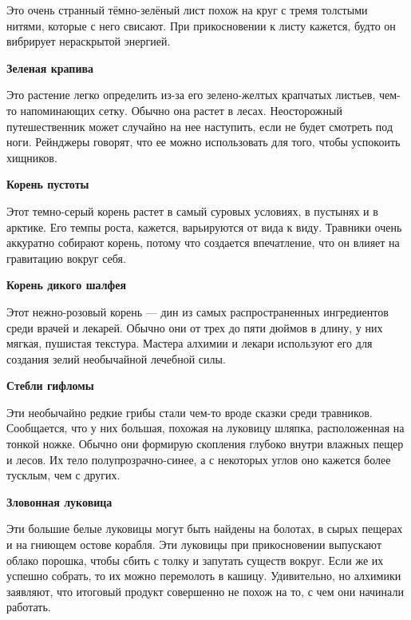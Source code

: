 \documentclass[a4paper, 9pt, twocolumn]{book}
\begin{document}
	\smallskip
	
	\noindent Это очень странный тёмно-зелёный лист похож на круг с тремя толстыми нитями, которые с него свисают. При прикосновении к листу кажется, будто он вибрирует нераскрытой энергией.
	
	\medspace
	
	\noindent \textbf{Зеленая крапива}
	
	\smallskip
	
	\noindent Это растение легко определить из-за его зелено-желтых крапчатых листьев, чем-то напоминающих сетку. Обычно она растет в лесах. Неосторожный путешественник может случайно на нее наступить, если не будет смотреть под ноги. Рейнджеры говорят, что ее можно использовать для того, чтобы успокоить хищников.
	
	\medspace
	
	\noindent \textbf{Корень пустоты}
	
	\smallskip
	
	\noindent Этот темно-серый корень растет в самый суровых условиях, в пустынях и в арктике. Его темпы роста, кажется, варьируются от вида к виду. Травники очень аккуратно собирают корень, потому что создается впечатление, что он влияет на гравитацию вокруг себя.
	
	\medspace
	
	\noindent \textbf{Корень дикого шалфея}
	
	\smallskip
	
	\noindent Этот нежно-розовый корень --- дин из самых распространенных ингредиентов среди врачей и лекарей. Обычно они от трех до пяти дюймов в длину, у них мягкая, пушистая текстура. Мастера алхимии и лекари используют его для создания зелий необычайной лечебной силы.
	
	\medspace
	
	\noindent \textbf{Стебли гифломы}
	
	\smallskip
	
	\noindent Эти необычайно редкие грибы стали чем-то вроде сказки среди травников. Сообщается, что у них большая, похожая на луковицу шляпка, расположенная на тонкой ножке. Обычно они формирую скопления глубоко внутри влажных пещер и лесов. Их тело полупрозрачно-синее, а с некоторых углов оно кажется более тусклым, чем с других.
	
	\medspace
	
	\noindent \textbf{Зловонная луковица}
	
	\smallskip
	
	\noindent Эти большие белые луковицы могут быть найдены на болотах, в сырых пещерах и на гниющем остове корабля. Эти луковицы при прикосновении выпускают облако порошка, чтобы сбить с толку и запутать существ вокруг. Если же их успешно собрать, то их можно перемолоть в кашицу. Удивительно, но алхимики заявляют, что итоговый продукт совершенно не похож на то, с чем они начинали работать.
	
\end{document}
